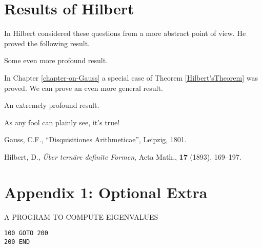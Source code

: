 \documentclass{report}
\begin{document}
\chapter{Results of Hilbert}     \label{chapter-on-Hilbert}

In \cite{bib:Hilbert1} Hilbert considered these questions from a
more abstract point of view. He proved the following result.

\begin{ttt}[Hilbert]      \label{Hilbert'sTheorem}
Some even more profound result.
\end{ttt}

In Chapter \ref{chapter-on-Gauss}
a special case of Theorem \ref{Hilbert'sTheorem} was proved.
We can prove an even more general result.

\begin{ttt}    \label{mytheorem}
An extremely profound result.
\end{ttt}

\begin{pf} As any fool can plainly see, it's true! 
\end{pf}



\begin{thebibliography}{99}             %

 Gauss, C.F.,
    ``Disquisitiones Arithmeticae'', Leipzig, 1801.

  Hilbert, D., 
    {\em \"{U}ber tern\"{a}re definite Formen},
    Acta Math., {\bf 17} (1893), 169--197.

\end{thebibliography}


\chapter*{Appendix 1: Optional Extra}

\begin{center}
   {\Large A PROGRAM TO COMPUTE EIGENVALUES}
\end{center}

\begin{verbatim}    
100 GOTO 200
200 END
\end{verbatim}    
\end{document}
